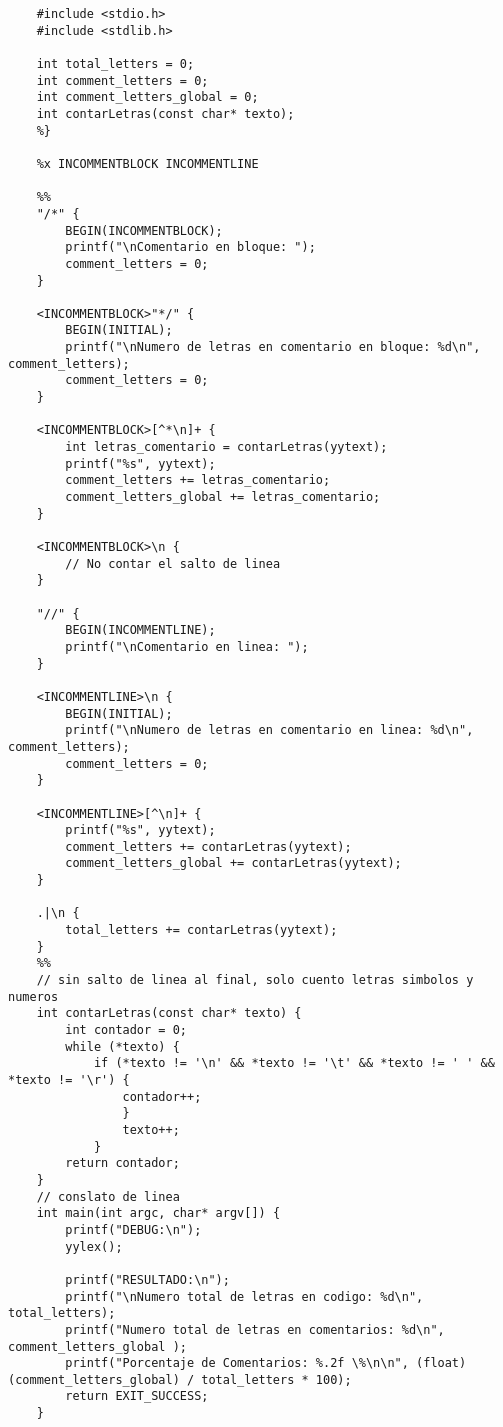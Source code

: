 \documentclass{article}
\begin{document}
    \lstset{language=C, breaklines=true, basicstyle=\footnotesize}
        \begin{lstlisting}[frame=single, caption={Codigo Analizador Lex}, title=(e) Codigo Analizador Lex]        
    %{
    #include <stdio.h>
    #include <stdlib.h>
                
    int total_letters = 0;
    int comment_letters = 0;  
    int comment_letters_global = 0;         
    int contarLetras(const char* texto);         
    %}
                
    %x INCOMMENTBLOCK INCOMMENTLINE
                
    %%       
    "/*" {
        BEGIN(INCOMMENTBLOCK);
        printf("\nComentario en bloque: ");
        comment_letters = 0;
    }
                
    <INCOMMENTBLOCK>"*/" {
        BEGIN(INITIAL);
        printf("\nNumero de letras en comentario en bloque: %d\n", comment_letters);
        comment_letters = 0;
    }
                
    <INCOMMENTBLOCK>[^*\n]+ {
        int letras_comentario = contarLetras(yytext);
        printf("%s", yytext);
        comment_letters += letras_comentario;
        comment_letters_global += letras_comentario;
    }
                         
    <INCOMMENTBLOCK>\n {
        // No contar el salto de linea
    }
                
    "//" {
        BEGIN(INCOMMENTLINE);
        printf("\nComentario en linea: ");
    }
                
    <INCOMMENTLINE>\n {
        BEGIN(INITIAL);
        printf("\nNumero de letras en comentario en linea: %d\n", comment_letters);
        comment_letters = 0;
    }
                
    <INCOMMENTLINE>[^\n]+ {
        printf("%s", yytext);
        comment_letters += contarLetras(yytext);
        comment_letters_global += contarLetras(yytext);
    }
                
    .|\n {
        total_letters += contarLetras(yytext);
    }         
    %%     
    // sin salto de linea al final, solo cuento letras simbolos y numeros
    int contarLetras(const char* texto) {
        int contador = 0;
        while (*texto) {
            if (*texto != '\n' && *texto != '\t' && *texto != ' ' && *texto != '\r') {
                contador++;
                }
                texto++;
            }
        return contador;
    }       
    // conslato de linea
    int main(int argc, char* argv[]) {
        printf("DEBUG:\n");
        yylex();
                    
        printf("RESULTADO:\n");
        printf("\nNumero total de letras en codigo: %d\n", total_letters);
        printf("Numero total de letras en comentarios: %d\n", comment_letters_global );
        printf("Porcentaje de Comentarios: %.2f \%\n\n", (float)(comment_letters_global) / total_letters * 100);   
        return EXIT_SUCCESS;
    }
        \end{lstlisting}
    
\end{document}
